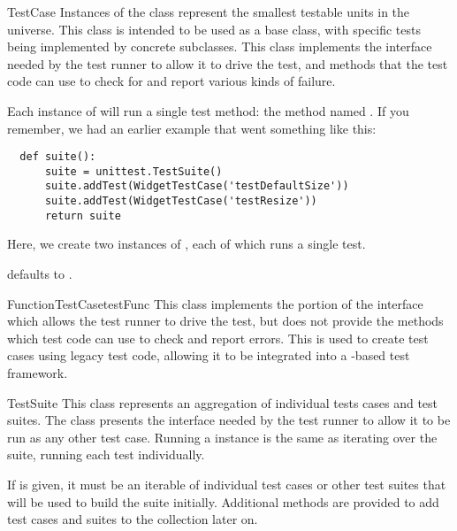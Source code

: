\begin{classdesc}{TestCase}{}
  Instances of the  class represent the smallest
  testable units in the  universe.  This class is
  intended to be used as a base class, with specific tests being
  implemented by concrete subclasses.  This class implements the
  interface needed by the test runner to allow it to drive the
  test, and methods that the test code can use to check for and
  report various kinds of failure.
  
  Each instance of  will run a single test method:
  the method named .  If you remember, we had an
  earlier example that went something like this:
  
  \begin{verbatim}
  def suite():
      suite = unittest.TestSuite()
      suite.addTest(WidgetTestCase('testDefaultSize'))
      suite.addTest(WidgetTestCase('testResize'))
      return suite
  \end{verbatim}
  
  Here, we create two instances of , each of
  which runs a single test.
  
   defaults to .
\end{classdesc}

\begin{classdesc}{FunctionTestCase}{testFunc}
  This class implements the portion of the  interface
  which allows the test runner to drive the test, but does not provide
  the methods which test code can use to check and report errors.
  This is used to create test cases using legacy test code, allowing
  it to be integrated into a -based test
  framework.
\end{classdesc}

\begin{classdesc}{TestSuite}{}
  This class represents an aggregation of individual tests cases and
  test suites.  The class presents the interface needed by the test
  runner to allow it to be run as any other test case.  Running a
   instance is the same as iterating over the suite,
  running each test individually.
  
  If  is given, it must be an iterable of individual test cases or
  other test suites that will be used to build the suite initially.
  Additional methods are provided to add test cases and suites to the
  collection later on.
\end{classdesc}

